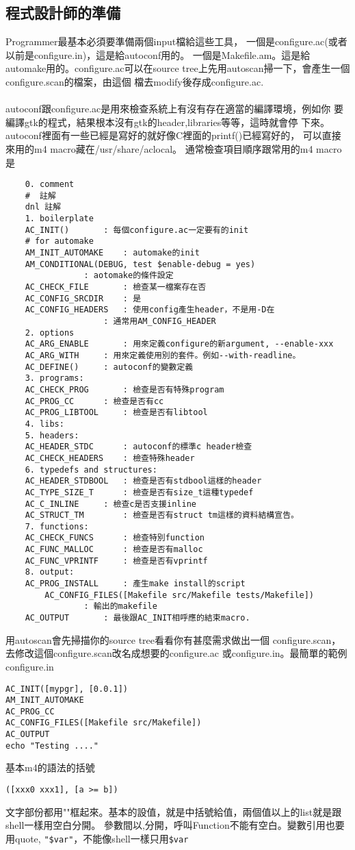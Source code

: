   \subsection{程式設計師的準備}
    Programmer最基本必須要準備兩個input檔給這些工具，
    一個是configure.ac(或者以前是configure.in)，這是給autoconf用的。
    一個是Makefile.am。這是給automake用的。configure.ac可以在source
    tree上先用autoscan掃一下，會產生一個configure.scan的檔案，由這個
    檔去modify後存成configure.ac.
    \\\\
    autoconf跟configure.ac是用來檢查系統上有沒有存在適當的編譯環境，例如你
    要編譯gtk的程式，結果根本沒有gtk的header,libraries等等，這時就會停
    下來。autoconf裡面有一些已經是寫好的就好像C裡面的printf()已經寫好的，
    可以直接來用的m4 macro藏在/usr/share/aclocal。
    通常檢查項目順序跟常用的m4 macro是
    \begin{verbatim}
    0. comment
	#  註解 
	dnl 註解
    1. boilerplate
	AC_INIT()		: 每個configure.ac一定要有的init
	# for automake
	AM_INIT_AUTOMAKE	: automake的init
	AM_CONDITIONAL(DEBUG, test $enable-debug = yes)
				: aotomake的條件設定
	AC_CHECK_FILE		: 檢查某一檔案存在否
	AC_CONFIG_SRCDIR	: 是
	AC_CONFIG_HEADERS	: 使用config產生header，不是用-D在
	     			: 通常用AM_CONFIG_HEADER
    2. options
	AC_ARG_ENABLE		: 用來定義configure的新argument, --enable-xxx
	AC_ARG_WITH		: 用來定義使用別的套件。例如--with-readline。
	AC_DEFINE()		: autoconf的變數定義
    3. programs:
	AC_CHECK_PROG		: 檢查是否有特殊program 
	AC_PROG_CC		: 檢查是否有cc
	AC_PROG_LIBTOOL		: 檢查是否有libtool
    4. libs:
    5. headers:
	AC_HEADER_STDC		: autoconf的標準c header檢查
	AC_CHECK_HEADERS	: 檢查特殊header
    6. typedefs and structures:
	AC_HEADER_STDBOOL	: 檢查是否有stdbool這樣的header
	AC_TYPE_SIZE_T		: 檢查是否有size_t這種typedef
	AC_C_INLINE		: 檢查c是否支援inline
	AC_STRUCT_TM		: 檢查是否有struct tm這樣的資料結構宣告。
    7. functions:
	AC_CHECK_FUNCS		: 檢查特別function
	AC_FUNC_MALLOC		: 檢查是否有malloc
	AC_FUNC_VPRINTF		: 檢查是否有vprintf
    8. output:
	AC_PROG_INSTALL		: 產生make install的script
    	AC_CONFIG_FILES([Makefile src/Makefile tests/Makefile])
		   		: 輸出的makefile
	AC_OUTPUT		: 最後跟AC_INIT相呼應的結束macro.
    \end{verbatim}
    用autoscan會先掃描你的source tree看看你有甚麼需求做出一個
    configure.scan，去修改這個configure.scan改名成想要的configure.ac
    或configure.in。最簡單的範例 configure.in
    \begin{verbatim}
AC_INIT([mypgr], [0.0.1])
AM_INIT_AUTOMAKE
AC_PROG_CC
AC_CONFIG_FILES([Makefile src/Makefile])
AC_OUTPUT
echo "Testing ...."
    \end{verbatim}
    基本m4的語法的括號
    \begin{verbatim}
([xxx0 xxx1], [a >= b])
    \end{verbatim}
    文字部份都用""框起來。基本的設值，就是中括號給值，兩個值以上的list就是跟
    shell一樣用空白分開。 參數間以,分開，呼叫Function不能有空白。變數引用也要
    用quote, \verb="$var"=，不能像shell一樣只用\verb=$var=
